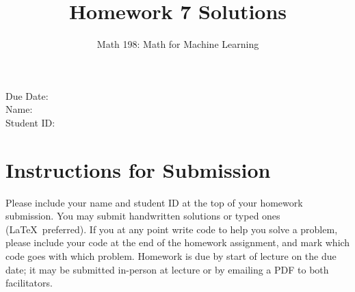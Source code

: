 \documentclass{article}
\title{Homework 7 Solutions}
\author{Math 198: Math for Machine Learning}
\date{}
\begin{document}
\maketitle

\noindent
Due Date:  \\
Name: \\
Student ID:

\section*{Instructions for Submission}
Please include your name and student ID at the top of your homework submission. You may submit handwritten solutions or typed ones (\LaTeX\ preferred). If you at any point write code to help you solve a problem, please include your code at the end of the homework assignment, and mark which code goes with which problem. Homework is due by start of lecture on the due date; it may be submitted in-person at lecture or by emailing a PDF to both facilitators.
\end{document}
